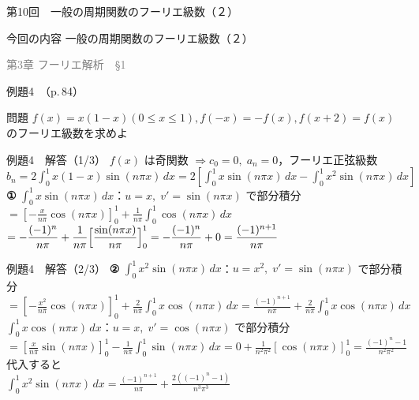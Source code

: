 \documentclass[professionalfonts]{beamer}
\begin{document}
\begin{frame}{第10回　一般の周期関数のフーリエ級数（２）}
  \begin{block}{今回の内容}
  一般の周期関数のフーリエ級数（２）
  \end{block}
  \vfill\hfill{\scriptsize \textcolor{gray}{第3章 フーリエ解析　§1}}
\end{frame}

\begin{frame}{例題4　（p.\,84）}
  \begin{exampleblock}{問題}
    $f(x) = x(1-x) (0 \leq x \leq 1), f(-x) = -f(x), f(x+2) = f(x)$ のフーリエ級数を求めよ\\[2pt]
  \end{exampleblock}
\end{frame}

\begin{frame}{例題4　解答（1/3）}
  $f(x)$ は奇関数 $\Rightarrow c_{0}=0,\;a_{n}=0$，フーリエ正弦級数\\[4pt]
  $\displaystyle b_{n} = 2\int_{0}^{1} x(1-x)\sin(n\pi x)\,dx
    = 2\!\left[\int_{0}^{1}x\sin(n\pi x)\,dx-\int_{0}^{1}x^{2}\sin(n\pi x)\,dx\right]$\\[6pt]
  \textbf{①} $\displaystyle\int_{0}^{1}x\sin(n\pi x)\,dx$：$u=x,\;v'=\sin(n\pi x)$ で部分積分\\[4pt]
  $\displaystyle
  =\left[-\frac{x}{n\pi}\cos(n\pi x)\right]_{0}^{1}+\frac{1}{n\pi}\int_{0}^{1}\cos(n\pi x)\,dx$\\[4pt]
  $\displaystyle
  =-\frac{(-1)^{n}}{n\pi}+\frac{1}{n\pi}\Bigl[\frac{\sin(n\pi x)}{n\pi}\Bigr]_{0}^{1}
  =-\frac{(-1)^{n}}{n\pi}+0=\frac{(-1)^{n+1}}{n\pi}$
\end{frame}

\begin{frame}{例題4　解答（2/3）}
  \textbf{②} $\displaystyle\int_{0}^{1}x^{2}\sin(n\pi x)\,dx$：$u=x^{2},\;v'=\sin(n\pi x)$ で部分積分\\[4pt]
  $\displaystyle
  =\left[-\frac{x^{2}}{n\pi}\cos(n\pi x)\right]_{0}^{1}+\frac{2}{n\pi}\int_{0}^{1}x\cos(n\pi x)\,dx
  =\frac{(-1)^{n+1}}{n\pi}+\frac{2}{n\pi}\int_{0}^{1}x\cos(n\pi x)\,dx$\\[6pt]
  $\displaystyle\int_{0}^{1}x\cos(n\pi x)\,dx$：$u=x,\;v'=\cos(n\pi x)$ で部分積分\\[4pt]
  $\displaystyle
  =\left[\frac{x}{n\pi}\sin(n\pi x)\right]_{0}^{1}-\frac{1}{n\pi}\int_{0}^{1}\sin(n\pi x)\,dx
  =0+\frac{1}{n^{2}\pi^{2}}[\cos(n\pi x)]_{0}^{1}=\frac{(-1)^{n}-1}{n^{2}\pi^{2}}$\\[6pt]
  代入すると\\[2pt]
  $\displaystyle\int_{0}^{1}x^{2}\sin(n\pi x)\,dx
  =\frac{(-1)^{n+1}}{n\pi}+\frac{2((-1)^{n}-1)}{n^{3}\pi^{3}}$
\end{frame}
\end{document}
